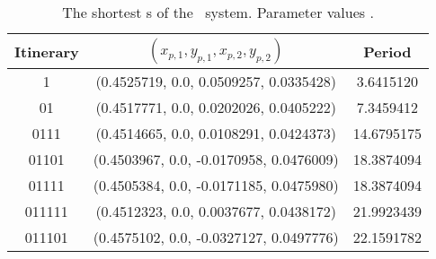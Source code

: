 \begin{table}
	\begin{tabular}{c|c|c}
	Itinerary & $(x_{p,1}, y_{p,1}, x_{p,2}, y_{p,2})$ & Period \\
	\hline
	1 & (0.4525719,   0.0, 0.0509257, 0.0335428) & 3.6415120 \\
 	\hline
	01 & (0.4517771,   0.0, 0.0202026, 0.0405222) & 7.3459412 \\
 	\hline
	0111 & (0.4514665,   0.0, 0.0108291, 0.0424373) & 14.6795175 \\
 	\hline
	01101 & (0.4503967,   0.0, -0.0170958, 0.0476009) & 18.3874094 \\
 	\hline
	01111 & (0.4505384,   0.0, -0.0171185, 0.0475980) & 18.3874094 \\
 	\hline
	011111 & (0.4512323,   0.0, 0.0037677, 0.0438172) & 21.9923439 \\
 	\hline
	011101 & (0.4575102,   0.0, -0.0327127, 0.0497776) & 22.1591782 \\
 	\end{tabular}
	\caption{
The shortest \rpo s of the \twomode\ system.
Parameter values .
    }
	\label{tab:twomoderpos}
\end{table}
